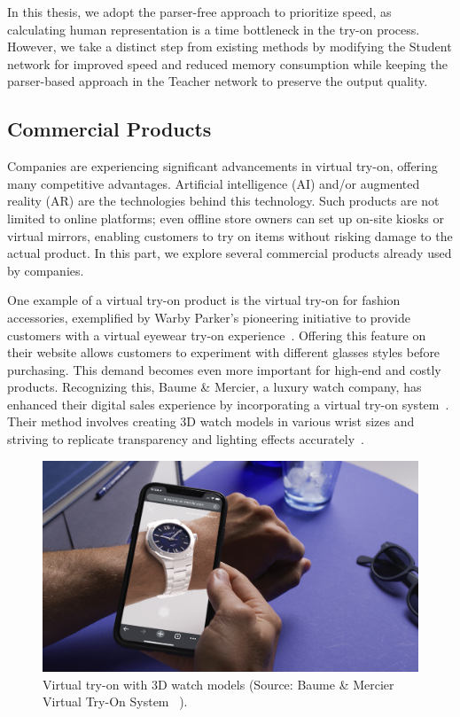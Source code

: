 In this thesis, we adopt the parser-free approach to prioritize speed, as calculating human representation is a time bottleneck in the try-on process. However, we take a distinct step from existing methods by modifying the Student network for improved speed and reduced memory consumption while keeping the parser-based approach in the Teacher network to preserve the output quality.

\subsection{Commercial Products}
Companies are experiencing significant advancements in virtual try-on, offering many competitive advantages. Artificial intelligence (AI) and/or augmented reality (AR) are the technologies behind this technology. Such products are not limited to online platforms; even offline store owners can set up on-site kiosks or virtual mirrors,  enabling customers to try on items without risking damage to the actual product. In this part, we explore several commercial products already used by companies.

One example of a virtual try-on product is the virtual try-on for fashion accessories, exemplified by Warby Parker's pioneering initiative to provide customers with a virtual eyewear try-on experience~\cite{WarbyParker-Glasses}. Offering this feature on their website allows customers to experiment with different glasses styles before purchasing. This demand becomes even more important for high-end and costly products. Recognizing this, Baume \& Mercier, a luxury watch company, has enhanced their digital sales experience by incorporating a virtual try-on system~\cite{BaumeMercierr-TimeTide-Watch}.  Their method involves creating 3D watch models in various wrist sizes and striving to replicate transparency and lighting effects accurately~\cite{BaumeMercierr-Hapticmedia-Watch}.

\begin{figure}[h!]
    \centering
    \includegraphics[width=\linewidth]{content/resources/images/literature-review/baume-mercier.png}
    \caption{Virtual try-on with 3D watch models (Source: Baume \& Mercier Virtual Try-On System ~\cite{BaumeMercierr-TimeTide-Watch}).}
    \label{fig:commercial-baume}
\end{figure}

